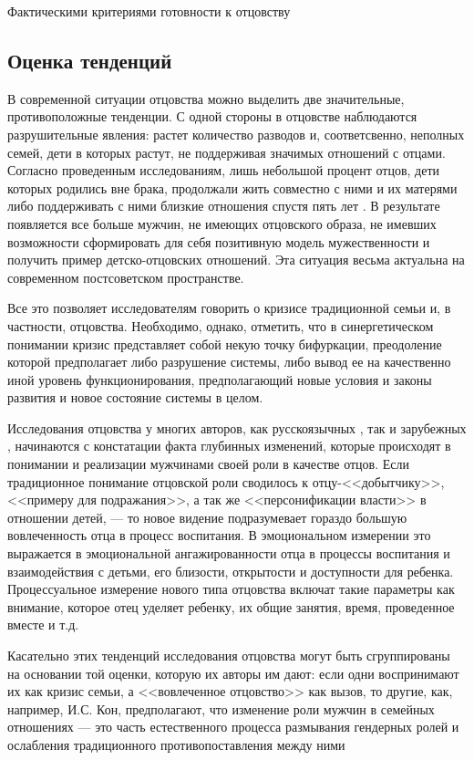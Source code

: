 \documentclass{../../common/thesisbyxetex}
\begin{document}
Фактическими критериями готовности  к отцовству


\subsection{Оценка тенденций}

В современной ситуации отцовства можно выделить две значительные, противоположные
тенденции. С одной стороны  в отцовстве наблюдаются разрушительные явления: растет количество
разводов и, соответсвенно, неполных семей, дети в которых растут, не поддерживая значимых отношений
с отцами. Согласно проведенным исследованиям, лишь небольшой процент отцов, дети которых
родились вне брака, продолжали жить совместно с ними и их матерями либо поддерживать с ними близкие
отношения спустя пять лет \cite{long}. В результате появляется все больше мужчин, не имеющих
отцовского образа, не имевших возможности сформировать для себя позитивную модель мужественности и
получить пример детско-отцовских отношений. Эта ситуация весьма актуальна на современном
постсоветском пространстве.



Все это позволяет исследователям говорить о кризисе традиционной семьи и, в частности, отцовства.
Необходимо, однако, отметить, что в синергетическом понимании кризис представляет собой некую точку
бифуркации, преодоление которой предполагает либо разрушение системы, либо вывод ее на качественно
иной уровень функционирования, предполагающий новые условия и законы развития и новое состояние
системы в целом.

Исследования отцовства у многих авторов, как русскоязычных \cite{relot, psyot}, так и зарубежных
\cite{meta, morfat, legfat}, начинаются с констатации факта глубинных изменений, которые происходят
в понимании и реализации мужчинами своей роли в качестве отцов. Если традиционное понимание
отцовской роли сводилось к отцу-<<добытчику>>, <<примеру для подражания>>, а так же
<<персонификации власти>> в отношении детей, --- то новое видение подразумевает гораздо большую
вовлеченность отца в процесс воспитания. В эмоциональном измерении это выражается в  эмоциональной
ангажированности отца в процессы воспитания и взаимодействия с детьми, его близости, открытости и
доступности для ребенка. Процессуальное измерение нового типа отцовства включат такие параметры как
внимание, которое отец уделяет ребенку, их общие занятия, время, проведенное вместе и т.д.


Касательно этих тенденций исследования отцовства могут быть сгруппированы на основании той оценки,
которую их авторы им дают: если одни воспринимают их как кризис семьи, а <<вовлеченное отцовство>>
как вызов, то другие, как, например, И.С. Кон, предполагают, что изменение роли мужчин в семейных
отношениях --- это часть естественного процесса размывания гендерных ролей и ослабления
традиционного противопоставления между ними \cite{konmen}
\end{document}
